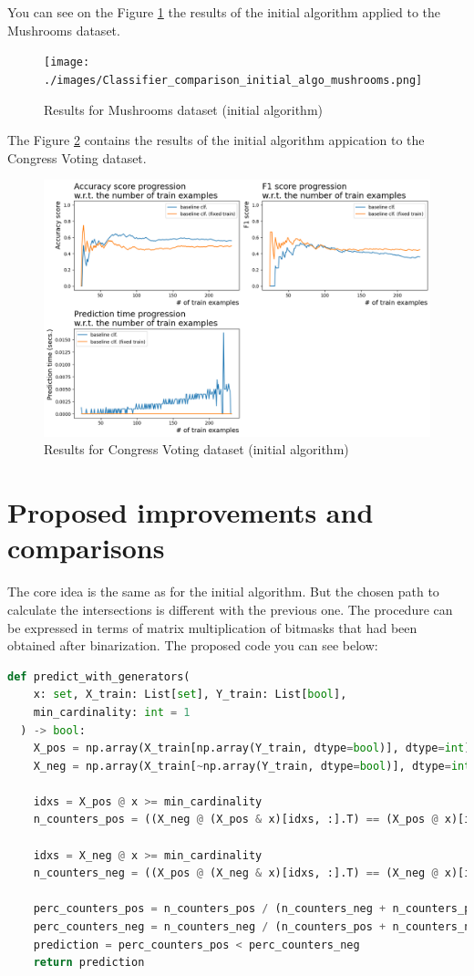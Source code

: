 \documentclass[12pt]{report}
\begin{document}
  You can see on the Figure \ref{fig:mushrooms_initial} the results of the initial algorithm applied to the Mushrooms dataset.
  \begin{figure}[H]
    \centering
    \texttt{[image: ./images/Classifier\_comparison\_initial\_algo\_mushrooms.png]}
    \caption{Results for Mushrooms dataset (initial algorithm)}
    \label{fig:mushrooms_initial}
  \end{figure}
  The Figure \ref{fig:congress_initial} contains the results of the initial algorithm appication to the Congress Voting dataset. 
  \begin{figure}[H]
    \centering
    \includegraphics[scale=0.5]{./images/Classifier_comparison_initial_algo_congress.png}
    \caption{Results for Congress Voting dataset (initial algorithm)}
    \label{fig:congress_initial}
  \end{figure}
\section{Proposed improvements and comparisons}
\par 
The core idea is the same as for the initial algorithm. But the chosen path to calculate the intersections is different with the previous one. The procedure can be expressed in terms of matrix multiplication of bitmasks that had been obtained after binarization. The proposed code you can see below:
\begin{lstlisting}[language=Python, caption=Python code]
  def predict_with_generators(
    x: set, X_train: List[set], Y_train: List[bool],
    min_cardinality: int = 1
  ) -> bool:
    X_pos = np.array(X_train[np.array(Y_train, dtype=bool)], dtype=int)
    X_neg = np.array(X_train[~np.array(Y_train, dtype=bool)], dtype=int)

    idxs = X_pos @ x >= min_cardinality
    n_counters_pos = ((X_neg @ (X_pos & x)[idxs, :].T) == (X_pos @ x)[idxs]).sum()

    idxs = X_neg @ x >= min_cardinality
    n_counters_neg = ((X_pos @ (X_neg & x)[idxs, :].T) == (X_neg @ x)[idxs]).sum()

    perc_counters_pos = n_counters_pos / (n_counters_neg + n_counters_pos)
    perc_counters_neg = n_counters_neg / (n_counters_pos + n_counters_neg)
    prediction = perc_counters_pos < perc_counters_neg
    return prediction
\end{lstlisting}
\end{document}

